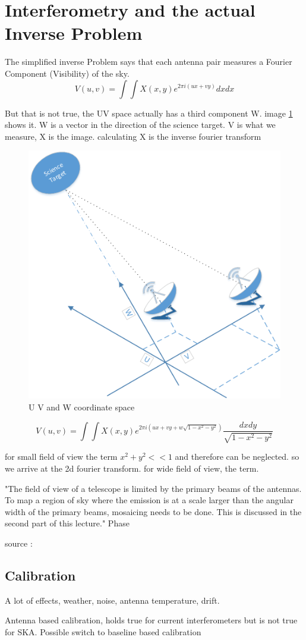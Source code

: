 \section{Interferometry and the actual Inverse Problem} \label{radio}

The simplified inverse Problem says that each antenna pair measures a Fourier Component (Visibility) of the sky. 
\begin{equation}\label{radio:eq:2dft}
V(u, v) = \int\int X(x, y) e^{2 \pi i (ux+vy)} dx dx
\end{equation}

But that is not true, the UV space actually has a third component W. image \ref{radio:uvw} shows it. W is a vector in the direction of the science target.
V is what we measure, X is the image. calculating X is the inverse fourier transform

\begin{figure}[h!] 
	\centering
	\includegraphics[width=0.6\linewidth]{./chapters/03.radio/uvw.png}
	\caption{U V and W coordinate space}
	\label{radio:uvw}
\end{figure}

\begin{equation}\label{radio:eq:ft}
V(u, v) = \int\int X(x, y) e^{2 \pi i (ux+vy+ w\sqrt{1 - x^2 - y ^2})} \frac{dx dy}{\sqrt{1 - x^2 - y ^2}}
\end{equation}

for small field of view the term  $x^2 + y^2 << 1$ and therefore can be neglected. so we arrive at the 2d fourier transform. for wide field of view, the term.

"The field of view of a telescope is limited by the primary beams of the antennas. To map a region of sky where the emission is at a scale larger than the angular width of the primary beams, mosaicing needs to be done. This is discussed in the second part of this lecture."
Phase 

source : %


\subsection{Calibration}
A lot of effects, weather, noise, antenna temperature, drift.

Antenna based calibration, holds true for current interferometers but is not true for SKA. Possible switch to baseline based calibration